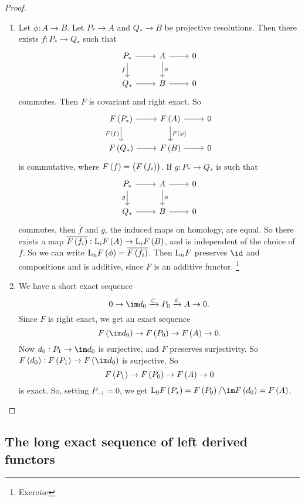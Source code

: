 \begin{proof}
\begin{enumerate}
\pagebreak

\item Let $ \phi : A \to B $. Let $ P_* \to A $ and $ Q_* \to B $ be projective resolutions. Then there exists $ f : P_* \to Q_* $ such that
$$
\begin{tikzcd}
P_* \arrow{r} \arrow{d}[swap]{f} & A \arrow{r} \arrow{d}{\phi} & 0 \\
Q_* \arrow{r} & B \arrow{r} & 0
\end{tikzcd}
$$
commutes. Then $ F $ is covariant and right exact. So
$$
\begin{tikzcd}
F\br{P_*} \arrow{r} \arrow{d}[swap]{F\br{f}} & F\br{A} \arrow{r} \arrow{d}{F\br{\phi}} & 0 \\
F\br{Q_*} \arrow{r} & F\br{B} \arrow{r} & 0
\end{tikzcd}
$$
is commutative, where $ F\br{f} = \br{F\br{f_i}} $. If $ g : P_* \to Q_* $ is such that
$$
\begin{tikzcd}
P_* \arrow{r} \arrow{d}[swap]{g} & A \arrow{r} \arrow{d}{\phi} & 0 \\
Q_* \arrow{r} & B \arrow{r} & 0
\end{tikzcd}
$$
commutes, then $ \overline{f} $ and $ \overline{g} $, the induced maps on homology, are equal. So there exists a map $ \overline{F\br{f_i}} : \L_iF\br{A} \to \L_iF\br{B} $, and is independent of the choice of $ f $. So we can write $ \L_nF\br{\phi} = \overline{F\br{f_i}} $. Then $ \mathrm{L}_nF $ preserves $ \id $ and compositions and is additive, since $ F $ is an additive functor. \footnote{Exercise}
\item We have a short exact sequence
$$ 0 \to \im d_0 \xrightarrow{\subset} P_0 \xrightarrow{\phi} A \to 0. $$
Since $ F $ is right exact, we get an exact sequence
$$ F\br{\im d_0} \to F\br{P_0} \to F\br{A} \to 0. $$
Now $ d_0 : P_1 \to \im d_0 $ is surjective, and $ F $ preserves surjectivity. So $ F\br{d_0} : F\br{P_1} \to F\br{\im d_0} $ is surjective. So
$$ F\br{P_1} \to F\br{P_0} \to F\br{A} \to 0 $$
is exact. So, setting $ P_{-1} = 0 $, we get $ \L_0F\br{P_*} = F\br{P_0} / \im F\br{d_0} = F\br{A} $.
\end{enumerate}
\end{proof}

\subsection{The long exact sequence of left derived functors}


